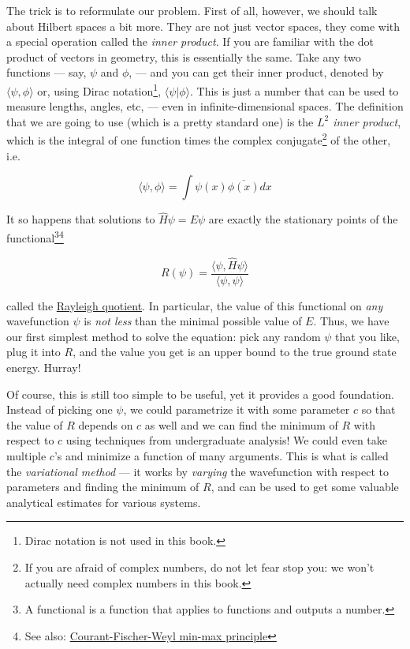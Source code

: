 \documentclass{article}
\begin{document}
The trick is to reformulate our problem. First of all, however, we should talk about Hilbert spaces a bit more. They are not just vector spaces, they come with a special operation called the \textit{inner product}. If you are familiar with the dot product of vectors in geometry, this is essentially the same. Take any two functions --- say, \(\psi\) and \(\phi\), --- and you can get their inner product, denoted by \(\langle \psi, \phi \rangle\) or, using Dirac notation\footnote{Dirac notation is not used in this book.}, \(\langle \psi | \phi \rangle\). This is just a number that can be used to measure lengths, angles, etc, --- even in infinite-dimensional spaces. The definition that we are going to use (which is a pretty standard one) is the \textit{\(L^2\) inner product}, which is the integral of one function times the complex conjugate\footnote{If you are afraid of complex numbers, do not let fear stop you: we won't actually need complex numbers in this book.} of the other, i.e.

\begin{equation} \label{eq:l2prod} \langle \psi, \phi \rangle = \int \psi(x) \overline{\phi(x)} dx \end{equation}

It so happens\textsuperscript{\cite{ref:atkins}} that solutions to \(\hat H \psi = E \psi\) are exactly the stationary points of the functional\footnote{A functional is a function that applies to functions and outputs a number.}\footnote{See also: \href{https://en.wikipedia.org/wiki/Min-max_theorem\#Self-adjoint_operators}{Courant-Fischer-Weyl min-max principle}}

\begin{equation} \label{eq:rayleigh} R(\psi) = \frac{\langle \psi, \hat H \psi \rangle}{\langle \psi, \psi \rangle} \end{equation}

called the \href{https://en.wikipedia.org/wiki/Rayleigh_quotient}{Rayleigh quotient}. In particular, the value of this functional on \textit{any} wavefunction \(\psi\) is \textit{not less} than the minimal possible value of \(E\). Thus, we have our first simplest method to solve the equation: pick any random \(\psi\) that you like, plug it into \(R\), and the value you get is an upper bound to the true ground state energy. Hurray!

Of course, this is still too simple to be useful, yet it provides a good foundation. Instead of picking one \(\psi\), we could parametrize it with some parameter \(c\) so that the value of \(R\) depends on \(c\) as well and we can find the minimum of \(R\) with respect to \(c\) using techniques from undergraduate analysis!\textsuperscript{\cite{ref:atkins}} We could even take multiple \(c\)'s and minimize a function of many arguments. This is what is called the \textit{variational method} --- it works by \textit{varying} the wavefunction with respect to parameters and finding the minimum of \(R\), and can be used to get some valuable analytical estimates for various systems\textsuperscript{\cite{ref:atkins}}.
\end{document}
